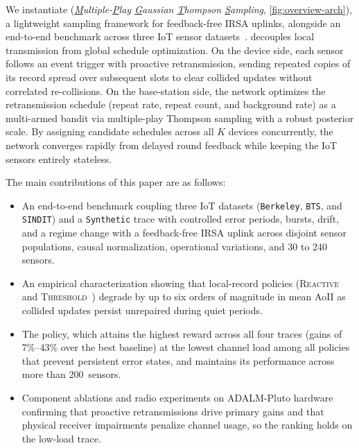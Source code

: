 \documentclass[conference]{IEEEtran}
\begin{document}
  We instantiate \tool{} (\emph{\underline{M}ultiple-\underline{P}lay \underline{G}aussian \underline{T}hompson \underline{S}ampling}, \autoref{fig:overview-arch}), a lightweight sampling framework for feedback-free IRSA uplinks, alongside an end-to-end benchmark across three IoT sensor datasets~\cite{bodik2004intel,truong2022haivan,nguyen2024security}.
  \tool decouples local transmission from global schedule optimization.
  On the device side, each sensor follows an event trigger with proactive retransmission, sending repeated copies of its record spread over subsequent slots to clear collided updates without correlated re-collisions.
  On the base-station side, the network optimizes the retransmission schedule (repeat rate, repeat count, and background rate) as a multi-armed bandit via multiple-play Thompson sampling with a robust posterior scale.
  By assigning candidate schedules across all $K$ devices concurrently, the network converges rapidly from delayed round feedback while keeping the IoT sensors entirely stateless.

  The main contributions of this paper are as follows:
  \begin{itemize}
    \item An end-to-end benchmark coupling three IoT datasets (\texttt{Berkeley}, \texttt{BTS}, and \texttt{SINDIT}) and a \texttt{Synthetic} trace with controlled error periods, bursts, drift, and a regime change with a feedback-free IRSA uplink across disjoint sensor populations, causal normalization, operational variations, and 30 to 240 sensors.
    \item An empirical characterization showing that local-record policies (\textsc{Reactive} and \textsc{Threshold}~\cite{nayak2023decentralized,mubarak2026threshold}) degrade by up to six orders of magnitude in mean AoII as collided updates persist unrepaired during quiet periods.
    \item The \tool policy, which attains the highest reward across all four traces (gains of 7\%--43\% over the best baseline) at the lowest channel load among all policies that prevent persistent error states, and maintains its performance across more than 200~sensors.
    \item Component ablations and radio experiments on ADALM-Pluto hardware confirming that proactive retransmissions drive primary gains and that physical receiver impairments penalize channel usage, so the ranking holds on the low-load trace.
  \end{itemize}
\end{document}
